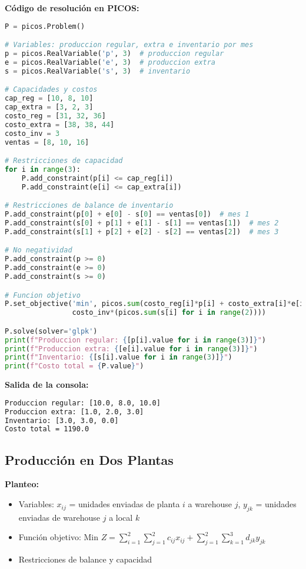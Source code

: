 \documentclass[12pt]{article}
\begin{document}
\textbf{Código de resolución en PICOS:}
\begin{lstlisting}[language=Python]
P = picos.Problem()

# Variables: produccion regular, extra e inventario por mes
p = picos.RealVariable('p', 3)  # produccion regular
e = picos.RealVariable('e', 3)  # produccion extra
s = picos.RealVariable('s', 3)  # inventario

# Capacidades y costos
cap_reg = [10, 8, 10]
cap_extra = [3, 2, 3]
costo_reg = [31, 32, 36]
costo_extra = [38, 38, 44]
costo_inv = 3
ventas = [8, 10, 16]

# Restricciones de capacidad
for i in range(3):
    P.add_constraint(p[i] <= cap_reg[i])
    P.add_constraint(e[i] <= cap_extra[i])

# Restricciones de balance de inventario
P.add_constraint(p[0] + e[0] - s[0] == ventas[0])  # mes 1
P.add_constraint(s[0] + p[1] + e[1] - s[1] == ventas[1])  # mes 2
P.add_constraint(s[1] + p[2] + e[2] - s[2] == ventas[2])  # mes 3

# No negatividad
P.add_constraint(p >= 0)
P.add_constraint(e >= 0)
P.add_constraint(s >= 0)

# Funcion objetivo
P.set_objective('min', picos.sum(costo_reg[i]*p[i] + costo_extra[i]*e[i] for i in range(3)) + 
                costo_inv*(picos.sum(s[i] for i in range(2))))

P.solve(solver='glpk')
print(f"Produccion regular: {[p[i].value for i in range(3)]}")
print(f"Produccion extra: {[e[i].value for i in range(3)]}")
print(f"Inventario: {[s[i].value for i in range(3)]}")
print(f"Costo total = {P.value}")
\end{lstlisting}

\textbf{Salida de la consola:}
\begin{lstlisting}[language=bash,backgroundcolor=\color{black},basicstyle=\color{white}\ttfamily,numbers=none]
Produccion regular: [10.0, 8.0, 10.0]
Produccion extra: [1.0, 2.0, 3.0]
Inventario: [3.0, 3.0, 0.0]
Costo total = 1190.0
\end{lstlisting}

\subsection{Producción en Dos Plantas}

\textbf{Planteo:}
\begin{itemize}
\item Variables: $x_{ij}$ = unidades enviadas de planta $i$ a warehouse $j$, $y_{jk}$ = unidades enviadas de warehouse $j$ a local $k$
\item Función objetivo: Min $Z = \sum_{i=1}^2 \sum_{j=1}^2 c_{ij}x_{ij} + \sum_{j=1}^2 \sum_{k=1}^3 d_{jk}y_{jk}$
\item Restricciones de balance y capacidad
\end{itemize}
\end{document}
